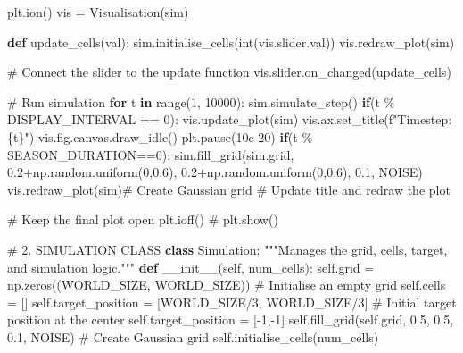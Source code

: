 \documentclass[
  letterpaper,
  DIV=11,
  numbers=noendperiod]{scrreprt}
\newenvironment{Shaded}{\begin{snugshade}}{\end{snugshade}}
\newcommand{\BuiltInTok}[1]{\textcolor[rgb]{0.00,0.23,0.31}{#1}}
\newcommand{\CommentTok}[1]{\textcolor[rgb]{0.37,0.37,0.37}{#1}}
\newcommand{\ControlFlowTok}[1]{\textcolor[rgb]{0.00,0.23,0.31}{\textbf{#1}}}
\newcommand{\DecValTok}[1]{\textcolor[rgb]{0.68,0.00,0.00}{#1}}
\newcommand{\FloatTok}[1]{\textcolor[rgb]{0.68,0.00,0.00}{#1}}
\newcommand{\FunctionTok}[1]{\textcolor[rgb]{0.28,0.35,0.67}{#1}}
\newcommand{\KeywordTok}[1]{\textcolor[rgb]{0.00,0.23,0.31}{\textbf{#1}}}
\newcommand{\NormalTok}[1]{\textcolor[rgb]{0.00,0.23,0.31}{#1}}
\newcommand{\OperatorTok}[1]{\textcolor[rgb]{0.37,0.37,0.37}{#1}}
\newcommand{\SpecialCharTok}[1]{\textcolor[rgb]{0.37,0.37,0.37}{#1}}
\newcommand{\SpecialStringTok}[1]{\textcolor[rgb]{0.13,0.47,0.30}{#1}}
\newcommand{\VariableTok}[1]{\textcolor[rgb]{0.07,0.07,0.07}{#1}}
\theoremstyle{definition}
\theoremstyle{remark}
\begin{document}
\begin{tcolorbox}
\begin{Shaded}
\begin{Highlighting}[]
\NormalTok{    plt.ion()}
\NormalTok{    vis }\OperatorTok{=}\NormalTok{ Visualisation(sim)}


    \KeywordTok{def}\NormalTok{ update\_cells(val):}
\NormalTok{        sim.initialise\_cells(}\BuiltInTok{int}\NormalTok{(vis.slider.val))}
\NormalTok{        vis.redraw\_plot(sim)}
        
    \CommentTok{\# Connect the slider to the update function}
\NormalTok{    vis.slider.on\_changed(update\_cells)}

    \CommentTok{\# Run simulation}
    \ControlFlowTok{for}\NormalTok{ t }\KeywordTok{in} \BuiltInTok{range}\NormalTok{(}\DecValTok{1}\NormalTok{, }\DecValTok{10000}\NormalTok{):}
\NormalTok{        sim.simulate\_step()}
        \ControlFlowTok{if}\NormalTok{(t }\OperatorTok{\%}\NormalTok{ DISPLAY\_INTERVAL }\OperatorTok{==} \DecValTok{0}\NormalTok{):}
\NormalTok{            vis.update\_plot(sim)}
\NormalTok{            vis.ax.set\_title(}\SpecialStringTok{f"Timestep: }\SpecialCharTok{\{}\NormalTok{t}\SpecialCharTok{\}}\SpecialStringTok{"}\NormalTok{)}
\NormalTok{            vis.fig.canvas.draw\_idle()}
\NormalTok{            plt.pause(}\FloatTok{10e{-}20}\NormalTok{)}
        \ControlFlowTok{if}\NormalTok{(t }\OperatorTok{\%}\NormalTok{ SEASON\_DURATION}\OperatorTok{==}\DecValTok{0}\NormalTok{):}
\NormalTok{            sim.fill\_grid(sim.grid, }\FloatTok{0.2}\OperatorTok{+}\NormalTok{np.random.uniform(}\DecValTok{0}\NormalTok{,}\FloatTok{0.6}\NormalTok{), }\FloatTok{0.2}\OperatorTok{+}\NormalTok{np.random.uniform(}\DecValTok{0}\NormalTok{,}\FloatTok{0.6}\NormalTok{), }\FloatTok{0.1}\NormalTok{, NOISE)}
\NormalTok{            vis.redraw\_plot(sim)}\CommentTok{\# Create Gaussian grid}
        \CommentTok{\# Update title and redraw the plot}

    \CommentTok{\# Keep the final plot open}
\NormalTok{    plt.ioff()}
    \CommentTok{\# plt.show()}



\CommentTok{\# 2. SIMULATION CLASS}
\KeywordTok{class}\NormalTok{ Simulation:}
    \CommentTok{"""Manages the grid, cells, target, and simulation logic."""}
    \KeywordTok{def} \FunctionTok{\_\_init\_\_}\NormalTok{(}\VariableTok{self}\NormalTok{, num\_cells):}
        \VariableTok{self}\NormalTok{.grid }\OperatorTok{=}\NormalTok{ np.zeros((WORLD\_SIZE, WORLD\_SIZE))  }\CommentTok{\# Initialise an empty grid}
        \VariableTok{self}\NormalTok{.cells }\OperatorTok{=}\NormalTok{ []}
        \VariableTok{self}\NormalTok{.target\_position }\OperatorTok{=}\NormalTok{ [WORLD\_SIZE}\OperatorTok{/}\DecValTok{3}\NormalTok{, WORLD\_SIZE}\OperatorTok{/}\DecValTok{3}\NormalTok{]  }\CommentTok{\# Initial target position at the center}
        \VariableTok{self}\NormalTok{.target\_position }\OperatorTok{=}\NormalTok{ [}\OperatorTok{{-}}\DecValTok{1}\NormalTok{,}\OperatorTok{{-}}\DecValTok{1}\NormalTok{]}
        \VariableTok{self}\NormalTok{.fill\_grid(}\VariableTok{self}\NormalTok{.grid, }\FloatTok{0.5}\NormalTok{, }\FloatTok{0.5}\NormalTok{, }\FloatTok{0.1}\NormalTok{, NOISE)  }\CommentTok{\# Create Gaussian grid}
        \VariableTok{self}\NormalTok{.initialise\_cells(num\_cells)}


\end{Highlighting}
\end{Shaded}
\end{tcolorbox}
\end{document}
